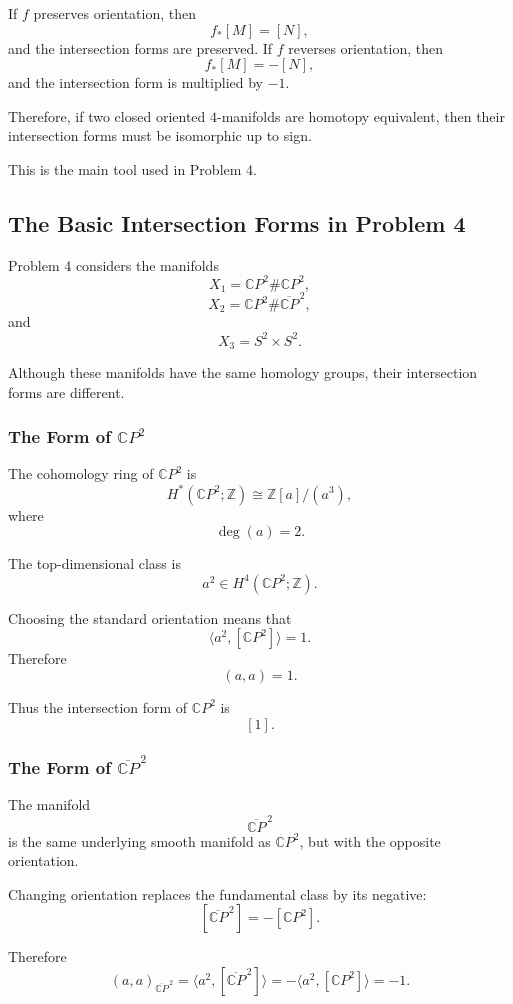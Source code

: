 \documentclass[12pt,a4paper]{article}
\theoremstyle{notespace}
\begin{document}
If \(f\) preserves orientation, then
\[
f_*[M]=[N],
\]
and the intersection forms are preserved. If \(f\) reverses orientation, then
\[
f_*[M]=-[N],
\]
and the intersection form is multiplied by \(-1\).

Therefore, if two closed oriented \(4\)-manifolds are homotopy equivalent, then
their intersection forms must be isomorphic up to sign.

This is the main tool used in Problem 4.

\subsection{The Basic Intersection Forms in Problem 4}

Problem 4 considers the manifolds
\[
X_1=\mathbb CP^2\#\mathbb CP^2,
\]
\[
X_2=\mathbb CP^2\#\overline{\mathbb CP}^{\,2},
\]
and
\[
X_3=S^2\times S^2.
\]

Although these manifolds have the same homology groups, their intersection forms
are different.

\subsubsection{The Form of \(\mathbb CP^2\)}

The cohomology ring of \(\mathbb CP^2\) is
\[
H^*(\mathbb CP^2;\mathbb Z)
\cong
\mathbb Z[a]/(a^3),
\]
where
\[
\deg(a)=2.
\]

The top-dimensional class is
\[
a^2\in H^4(\mathbb CP^2;\mathbb Z).
\]

Choosing the standard orientation means that
\[
\langle a^2,[\mathbb CP^2]\rangle=1.
\]
Therefore
\[
(a,a)=1.
\]

Thus the intersection form of \(\mathbb CP^2\) is
\[
[1].
\]

\subsubsection{The Form of \(\overline{\mathbb CP}^{\,2}\)}

The manifold
\[
\overline{\mathbb CP}^{\,2}
\]
is the same underlying smooth manifold as \(\mathbb CP^2\), but with the opposite
orientation.

Changing orientation replaces the fundamental class by its negative:
\[
[\overline{\mathbb CP}^{\,2}]=-[\mathbb CP^2].
\]

Therefore
\[
(a,a)_{\overline{\mathbb CP}^{\,2}}
=
\langle a^2,[\overline{\mathbb CP}^{\,2}]\rangle
=
-\langle a^2,[\mathbb CP^2]\rangle
=
-1.
\]
\end{document}
